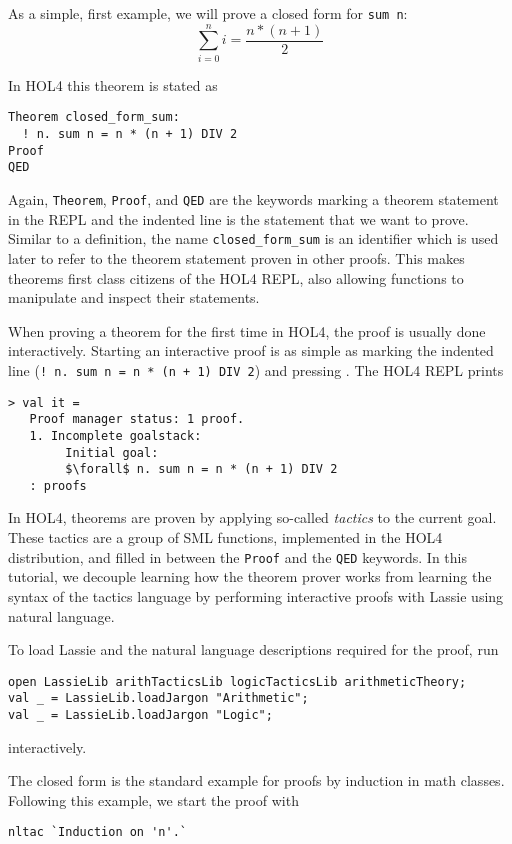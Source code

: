 As a simple, first example, we will prove a closed form for \lstinline{sum n}:
\[
  \sum_{i=0}^{n} i = \frac{n * (n + 1)}{2}
\]

In HOL4 this theorem is stated as

\begin{lstlisting}
Theorem closed_form_sum:
  ! n. sum n = n * (n + 1) DIV 2
Proof
QED
\end{lstlisting}

Again, \lstinline{Theorem}, \lstinline{Proof}, and \lstinline{QED} are the
keywords marking a theorem statement in the REPL and the indented line is
the statement that we want to prove.
Similar to a definition, the name \lstinline{closed_form_sum} is an identifier
which is used later to refer to the theorem statement proven in other proofs.
This makes theorems first class citizens of the HOL4 REPL, also allowing
functions to manipulate and inspect their statements.

When proving a theorem for the first time in HOL4, the proof is usually done
interactively.
Starting an interactive proof is as simple as marking the indented line
(\lstinline{! n. sum n = n * (n + 1) DIV 2}) and pressing .
The HOL4 REPL prints

\begin{lstlisting}[mathescape=true, frame=single]
> val it =
   Proof manager status: 1 proof.
   1. Incomplete goalstack:
        Initial goal:
        $\forall$ n. sum n = n * (n + 1) DIV 2
   : proofs
\end{lstlisting}

In HOL4, theorems are proven by applying so-called \emph{tactics} to the current
goal.
These tactics are a group of SML functions, implemented in the HOL4
distribution, and filled in between the \lstinline{Proof} and the \lstinline{QED}
keywords.
In this tutorial, we decouple learning how the theorem prover works from
learning the syntax of the tactics language by performing interactive proofs
with Lassie using natural language.

To load Lassie and the natural language descriptions required for the proof,
run
\begin{lstlisting}
open LassieLib arithTacticsLib logicTacticsLib arithmeticTheory;
val _ = LassieLib.loadJargon "Arithmetic";
val _ = LassieLib.loadJargon "Logic";
\end{lstlisting}
interactively.

The closed form is the standard example for proofs by induction in math classes.
Following this example, we start the proof with
\begin{lstlisting}
nltac `Induction on 'n'.`
\end{lstlisting}

